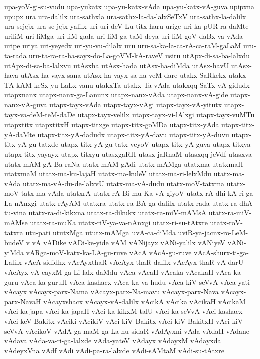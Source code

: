 {upa-yoV-gi-su-vudu
upa-yukatx
upa-yu-katx-vAda
upa-yu-katx-vA-guva
upipxna
upupx
ura
ura-dalilx
ura-sathxla
ura-sathx-la-da-lalxSeTxV
ura-sathx-la-dalilx
ura-sejejx
ura-se-jejx-yalilx
uri
uri-deV-Lu-titx-haru
urige
uri-ka-pUR-ra-daMte
uriliM
uri-liMga
uri-liM-gada
uri-liM-ga-taM-deya
uri-liM-goV-daBx-va-vAda
uripe
uriya
uri-yeyedx
uri-yu-vu-dilalx
uru
uru-sa-ka-la-ca-rA-ca-raM-gaLaM
uru-ta-rada
uru-ta-ra-ra-ha-sayx-do-La-goVM-kA-raveV
usiru
utApx-di-sa-ba-lalxdu
utApx-di-sa-ba-lalxvu
utAsxha
utAsx-hada
utAsx-ha-diMda
utAsx-havU
utAsx-hava
utAsx-ha-vayx-sana
utAsx-ha-vayx-sa-na-veM-dare
utakx-SaRkekx
utakx-TA-kAM-keSx-yu-LaLx-vanu
utakxTa
utakx-Ta-vAda
utakxqq-SaTx-vA-gidudx
utapxnanx
utapx-nanx-ga-Lanunx
utapx-nanx-vAda
utapx-nanx-vA-gide
utapx-nanx-vA-guva
utapx-tayx-vAda
utapx-tayx-vAgi
utapx-tayx-vA-yitutx
utapx-tayx-va-deM-teM-daDe
utapx-tayx-velilx
utapx-tayx-vi-lAlxgi
utapx-tayx-vuMTu
utapxtitx
utapxtitxH
utapx-titxge
utapx-titx-goMDa
utapx-titx-yAda
utapx-titx-yA-daMte
utapx-titx-yA-dadudx
utapx-titx-yA-davu
utapx-titx-yA-duvu
utapx-titx-yA-gu-tatxde
utapx-titx-yA-gu-tatx-veyoV
utapx-titx-yA-guva
utapx-titxya
utapx-titx-yayayx
utapx-titxyu
utasxgaRH
utasx-jaRnaM
utasxqq-jeVdf
utasxva
utatx-mAM-gA-Ba-raNa
utatx-mAM-gAdi
utatx-mAMga
utatxma
utatxmaH
utatxmaM
utatx-ma-ku-lajaH
utatx-ma-kuleV
utatx-ma-ri-lelxMdu
utatx-ma-vAda
utatx-ma-vA-du-de-lalxvU
utatx-ma-vA-dudu
utatx-moV-tatxma
utatx-moV-tatx-ma-vAda
utatxrA
utatx-rA-Bi-mu-Ka-vA-giyoV
utatx-rA-dhi-kA-ri-ga-La-nAnxgi
utatx-rAyAM
utatxra
utatx-ra-BA-ga-dalilx
utatx-rada
utatx-ra-dhA-tu-vina
utatx-ra-di-kikxna
utatx-ra-dikukx
utatx-ra-miV-mAMsA
utatx-ra-miV-mAMse
utatx-ra-muKa
utatx-riV-ya-va-nAnxgi
utatx-ri-su-tAtxre
utatx-roV-tatxra
utu-pati
ututxMga
ututx-mAMga
uvA-ca-diMda
uviR-ya-jacnx-ro-LeM-budeV
v
vA
vADike
vADi-ke-yide
vAM
vANijayx
vANi-yalilx
vANiyeV
vANi-yiMda
vARga-moV-katx-ka-LA-gu-ruve
vAcA
vAcA-gu-ruve
vAcA-shurx-ti-ga-Lalilx
vAcA-sididhx
vAcAyxthaR
vAcAyx-thaR-dalilx
vAcAyx-thaR-vA-darU
vAcAyx-vA-cayxM-ga-Li-lalx-daMdu
vAca
vAcaH
vAcaka
vAcakaH
vAca-ka-guru
vAca-ka-guruH
vAca-kashacx
vAca-ka-va-hudu
vAca-kiV-seVvA
vAca-yati
vAcayx
vAcayx-parx-Nama
vAcayx-parx-Na-mavu
vAcayx-parx-Nava
vAcayx-parx-NavaH
vAcayxshacx
vAcayx-vA-dalilx
vAcikA
vAcika
vAcikaH
vAcikaM
vAci-ka-japa
vAci-ka-japaH
vAci-ka-kikxM-talU
vAci-ka-seVvA
vAci-kashacx
vAci-keV-Bakitx
vAciki
vAcikiV
vAci-kiV-Bakitx
vAci-kiV-BakitxH
vAci-kiV-seVvA
vAcikoV
vAdA-ga-maM-ga-La-nu-sidaR
vAdAyxni
vAda
vAdaH
vAdane
vAdava
vAda-va-ri-ga-lalxde
vAda-yateV
vAdayx
vAdayxM
vAdayxda
vAdeyxVna
vAdf
vAdi
vAdi-pa-ra-lalxde
vAdi-sAMtaM
vAdi-su-tAtxre
}
